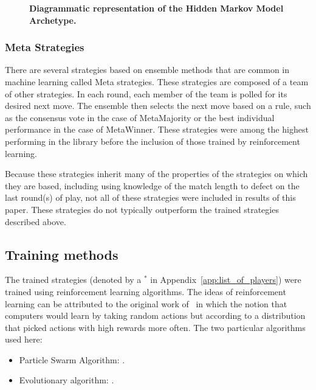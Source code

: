 \documentclass[10pt,letterpaper]{article}
\begin{document}
\begin{figure}[!hbtp]
    \centering
    \caption{\bf Diagrammatic representation of the Hidden Markov Model Archetype.}
    \label{fig:hmm}
\end{figure}


\subsubsection*{Meta Strategies}

There are several strategies based on ensemble methods that
are common in machine learning called Meta strategies. These strategies are
composed of a team of other strategies. In each round, each member of the team
is polled for its desired next
move. The ensemble then selects the next move based on a rule, such as the
consensus vote in the case of MetaMajority or the best individual performance
in the case of MetaWinner. These strategies were among the highest performing in 
the library before the inclusion of those trained by reinforcement learning. 

Because these strategies inherit many of the properties of the strategies
on which they are based, including using knowledge of the match length to defect
on the last round(s) of play, not all of these
strategies were included in results of this
paper. These strategies do not typically outperform the trained strategies
described above.

\subsection*{Training methods}\label{sec:methods}

The trained strategies (denoted by a \(^{*}\) in
Appendix~\ref{app:list_of_players}) were trained using reinforcement
learning algorithms. The ideas of reinforcement learning can be attributed to
the original work of~\cite{turing1950computing} in which the notion that
computers would learn by taking random actions but according to a distribution
that picked actions with high rewards more often. The two particular algorithms
used here:

\begin{itemize}
    \item Particle Swarm Algorithm: \cite{imran2013overview}.
    \item Evolutionary algorithm: \cite{moriarty1999evolutionary}.
\end{itemize}
\end{document}
